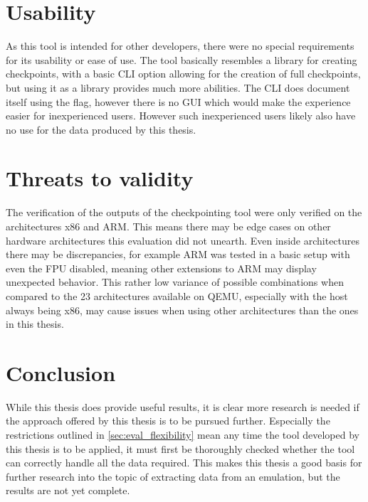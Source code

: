 \section{Usability}
As this tool is intended for other developers,
there were no special requirements for its usability or ease of use.
The tool basically resembles a library for creating checkpoints,
with a basic CLI option allowing for the creation of full checkpoints,
but using it as a library provides much more abilities.
The CLI does document itself using the  flag,
however there is no GUI which would make the experience easier for inexperienced users.
However such inexperienced users likely also have no use for the data produced by this thesis.

\section{Threats to validity}
The verification of the outputs of the checkpointing tool were only verified
on the architectures x86 and ARM.
This means there may be edge cases on other hardware architectures this evaluation did not unearth.
Even inside architectures there may be discrepancies,
for example ARM was tested in a basic setup with even the FPU disabled,
meaning other extensions to ARM may display unexpected behavior.
This rather low variance of possible combinations when compared to the 23 architectures available on QEMU,
especially with the host always being x86,
may cause issues when using other architectures than the ones in this thesis.

\section{Conclusion}
While this thesis does provide useful results,
it is clear more research is needed if the approach offered by this thesis is to be pursued further.
Especially the restrictions outlined in \autoref{sec:eval_flexibility}
mean any time the tool developed by this thesis is to be applied,
it must first be thoroughly checked whether the tool can correctly handle all the data required.
This makes this thesis a good basis for further research into the topic of extracting data from an emulation,
but the results are not yet complete.